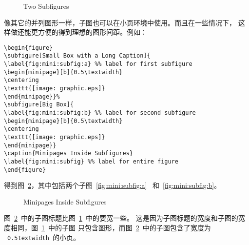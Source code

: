 \begin{figure} 
	\centering 
	\hspace{1in} 
	\caption{Two Subfigures} 
	\label{fig:subfig} %
\end{figure}

像其它的并列图形一样，子图也可以在小页环境中使用。而且在一些情况下，
这样做还能更方便的得到理想的图形间距。例如：
\begin{Verbatim}[xleftmargin=1cm]
\begin{figure} 
\subfigure[Small Box with a Long Caption]{ 
\label{fig:mini:subfig:a} %% label for first subfigure 
\begin{minipage}[b]{0.5\textwidth} 
\centering 
\texttt{[image: graphic.eps]} 
\end{minipage}}% 
\subfigure[Big Box]{ 
\label{fig:mini:subfig:b} %% label for second subfigure 
\begin{minipage}[b]{0.5\textwidth} 
\centering 
\texttt{[image: graphic.eps]} 
\end{minipage}} 
\caption{Minipages Inside Subfigures} 
\label{fig:mini:subfig} %% label for entire figure 
\end{figure}
\end{Verbatim}
得到图~\ref{fig:mini:subfig}，其中包括两个子图~\ref{fig:mini:subfig:a}~
和~\ref{fig:mini:subfig:b}。

\begin{figure} 
	\caption{Minipages Inside Subfigures} 
	\label{fig:mini:subfig} %
\end{figure}

图~\ref{fig:mini:subfig}~中的子图标题比图~\ref{fig:subfig}~中的要宽一些。
这是因为子图标题的宽度和子图的宽度相同，图~\ref{fig:subfig}~中的子图
只包含图形，而图~\ref{fig:mini:subfig}~中的子图包含了宽度为
~\texttt{0.5\bs textwidth}~的小页。

